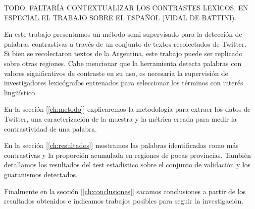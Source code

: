 

TODO: FALTARÍA CONTEXTUALIZAR LOS CONTRASTES LEXICOS, EN ESPECIAL EL TRABAJO SOBRE EL ESPAÑOL (VIDAL DE BATTINI).

\cite{baayen2001word}



En este trabajo presentamos un método semi-supervisado para la detección de palabras contrastivas a través de un conjunto de textos recolectados de Twitter. Si bien se recolectaron textos de la Argentina, este trabajo puede ser replicado sobre otras regiones. Cabe mencionar que la herramienta detecta palabras con valores significativos de contraste en su uso, es necesaria la supervisión de investigadores lexicógrafos entrenados para seleccionar los términos con interés lingüístico.

En la sección [\ref{ch:metodo}]
explicaremos la metodología para extraer los datos de Twitter, una caracterización de la muestra y la métrica creada para medir la contrastividad de una palabra.

En la sección [\ref{ch:resultados}] mostramos las palabras identificadas como más contrastivas y la proporción acumulada en regiones de pocas provincias. También detallamos los resultados del test estadístico sobre el conjunto de validación y los guaranismos detectados. 

Finalmente en la sección [\ref{ch:conclusiones}] sacamos conclusiones a partir de los resultados obtenidos e indicamos trabajos posibles para seguir la investigación.